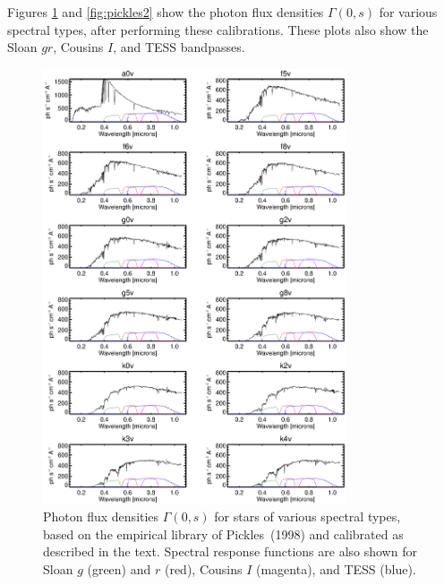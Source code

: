 \documentclass[preprint,10pt]{aastex}
\begin{document}
Figures \ref{fig:pickles1} and \ref{fig:pickles2} show the photon flux
densities $\Gamma(0,s)$ for various spectral types, after performing
these calibrations. These plots also show the Sloan $gr$, Cousins $I$, and TESS bandpasses.

\begin{figure}
\begin{center}
\includegraphics[width=0.8\textwidth]{pickles1.eps}
\end{center}
\caption{Photon flux densities $\Gamma(0,s)$ for stars of various
spectral types, based on the empirical library of Pickles~(1998) and
calibrated as described in the text. Spectral response functions are also shown
for Sloan $g$ (green) and $r$ (red), Cousins $I$ (magenta), 
and TESS (blue).}
\label{fig:pickles1}
\end{figure}
\end{document}
